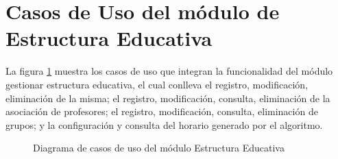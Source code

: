 
\section{Casos de Uso del módulo de Estructura Educativa}

La figura \ref{fig:casosUso:gestionarEstructuraEducativa} muestra los casos de uso que integran la funcionalidad del módulo gestionar estructura educativa, el cual conlleva el registro, modificación, eliminación de la misma; el registro, modificación, consulta, eliminación de la asociación de profesores; el registro, modificación, consulta, eliminación de grupos; y la configuración y consulta del horario generado por el algoritmo.
\begin{figure}[htpb!]
	\begin{center}
		\caption{Diagrama de casos de uso del módulo Estructura Educativa \label{fig:casosUso:gestionarEstructuraEducativa}}
	\end{center}
\end{figure}
